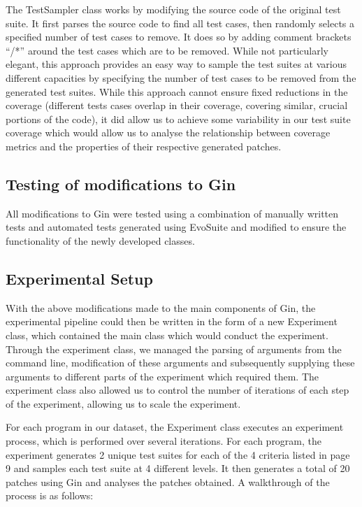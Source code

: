 \documentclass[titlepage]{article}
\begin{document}
The TestSampler class works by modifying the source code of the original test suite. It first parses the source code to find all test cases, then randomly selects a specified number of test cases to remove. It does so by adding comment brackets “/*” around the test cases which are to be removed. While not particularly elegant, this approach provides an easy way to sample the test suites at various different capacities by specifying the number of test cases to be removed from the generated test suites. While this approach cannot ensure fixed reductions in the coverage (different tests cases overlap in their coverage, covering similar, crucial portions of the code), it did allow us to achieve some variability in our test suite coverage which would allow us to analyse the relationship between coverage metrics and the properties of their respective generated patches.

\subsection{Testing of modifications to Gin}
All modifications to Gin were tested using a combination of manually written tests and automated tests generated using EvoSuite and modified to ensure the functionality of the newly developed classes.

\subsection{Experimental Setup}
With the above modifications made to the main components of Gin, the experimental pipeline could then be written in the form of a new Experiment class, which contained the main class which would conduct the experiment. Through the experiment class, we managed the parsing of arguments from the command line, modification of these arguments and subsequently supplying these arguments to different parts of the experiment which required them. The experiment class also allowed us to control the number of iterations of each step of the experiment, allowing us to scale the experiment. 

For each program in our dataset, the Experiment class executes an experiment process, which is performed over several iterations. For each program, the experiment generates 2 unique test suites for each of the 4 criteria listed in page 9 and samples each test suite at 4 different levels. It then generates a total of 20 patches using Gin and analyses the patches obtained. A walkthrough of the process is as follows:
\end{document}
